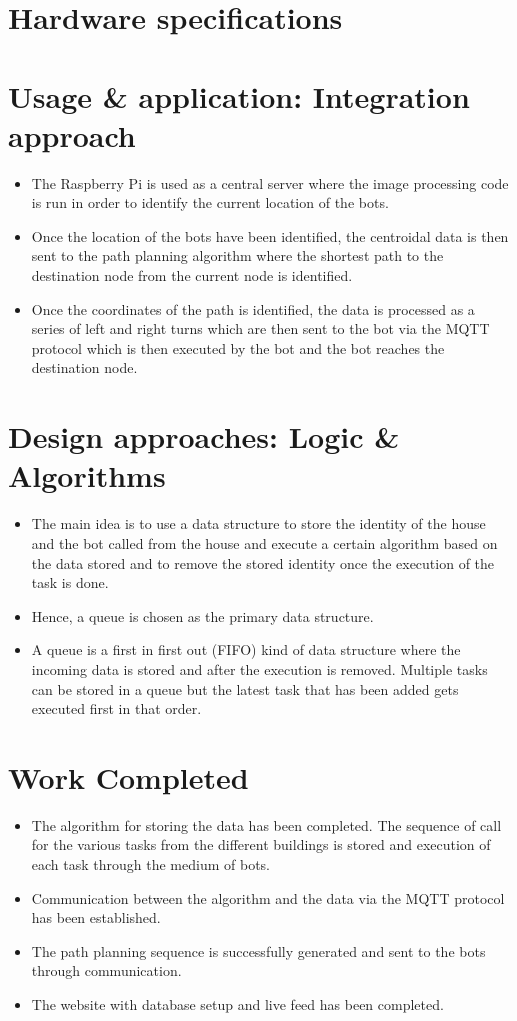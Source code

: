 \documentclass{article}[12pt,a4paper]
\begin{document}
\section{Hardware specifications}

\section{Usage \& application: Integration approach}
\begin{itemize}
	\item The Raspberry Pi is used as a central server where the image processing code is run in order to identify the current location of the bots. 
	\item Once the location of the bots have been identified, the centroidal data is then sent to the path planning algorithm where the shortest path to the destination node from the current node is identified. 
	\item Once the coordinates of the path is identified, the data is processed as a series of left and right turns which are then sent to the bot via the MQTT protocol which is then executed by the bot and the bot reaches the destination node.
\end{itemize}

\section{Design approaches: Logic \& Algorithms}
\begin{itemize}
	\item The main idea is to use a data structure to store the identity of the house and the bot called from the house and execute a certain algorithm based on the data stored and to remove the stored identity once the execution of the task is done.
	\item Hence, a queue is chosen as the primary data structure.
	\item A queue is a first in first out (FIFO) kind of data structure where the incoming data is stored and after the execution is removed. Multiple tasks can be stored in a queue but the latest task that has been added gets executed first in that order.
\end{itemize}

\section{Work Completed}
\begin{itemize}
	\item The algorithm for storing the data has been completed. The sequence of call for the various tasks from the different buildings is stored and execution of each task through the medium of bots.
	\item Communication between the algorithm and the data via the MQTT protocol has been established.
	\item The path planning sequence is successfully generated and sent to the bots through communication.
	\item The website with database setup and live feed has been completed.
\end{itemize}
\end{document}
